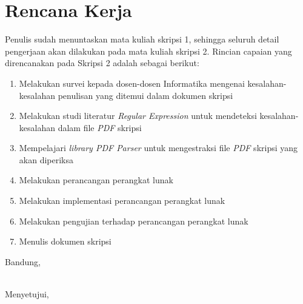 \documentclass[a4paper,twoside]{article}
\begin{document}
\section{Rencana Kerja}
Penulis sudah menuntaskan mata kuliah skripsi 1, sehingga seluruh detail pengerjaan akan dilakukan pada mata kuliah skripsi 2. Rincian capaian yang direncanakan pada Skripsi 2 adalah sebagai berikut:
\begin{enumerate}
	\item Melakukan survei kepada dosen-dosen Informatika mengenai kesalahan-kesalahan penulisan yang ditemui dalam dokumen skripsi	
	\item Melakukan studi literatur \textit{Regular Expression} untuk mendeteksi kesalahan-kesalahan dalam file \textit{PDF} skripsi
	\item Mempelajari \textit{library PDF Parser} untuk mengestraksi file \textit{PDF} skripsi yang akan diperiksa
	\item Melakukan perancangan perangkat lunak
	\item Melakukan implementasi perancangan perangkat lunak
	\item Melakukan pengujian terhadap perancangan perangkat lunak
	\item Menulis dokumen skripsi
\end{enumerate}

\vspace{1cm}
\centering Bandung, \tanggal\\
\vspace{2cm} \nama \\ 
\vspace{1cm}

Menyetujui, \\
\end{document}
